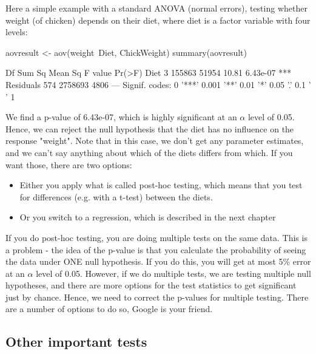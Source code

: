 \documentclass[a4paper,twoside]{tufte-book}\usepackage[]{graphicx}\usepackage[]{color}
\begin{document}
Here a simple example with a standard ANOVA (normal errors), testing whether weight (of chicken) depends on their diet, where diet is a factor variable with four levels:

\begin{Schunk}
\begin{Sinput}
aovresult <- aov(weight~Diet, ChickWeight)
summary(aovresult)
\end{Sinput}
\begin{Soutput}
             Df  Sum Sq Mean Sq F value   Pr(>F)    
Diet          3  155863   51954   10.81 6.43e-07 ***
Residuals   574 2758693    4806                     
---
Signif. codes:  0 '***' 0.001 '**' 0.01 '*' 0.05 '.' 0.1 ' ' 1
\end{Soutput}
\end{Schunk}

We find a p-value of  6.43e-07, which is highly significant at an $\alpha$ level of 0.05. Hence, we can reject the null hypothesis that the diet has no influence on the response "weight". Note that in this case, we don't get any parameter estimates, and we can't say anything about which of the diets differs from which. If you want those, there are two options:

\begin{itemize}
\item Either you apply what is called post-hoc testing, which means that you test for differences (e.g. with a t-test) between the diets.
\item Or you switch to a regression, which is described in the next chapter
\end{itemize}

If you do post-hoc testing, you are doing multiple tests on the same data. This is a problem - the idea of the p-value is that you calculate the probability of seeing the data under ONE null hypothesis. If you do this, you will get at most 5\% error at an $\alpha$ level of 0.05.  However, if we do multiple tests, we are testing multiple null hypotheses, and there are more options for the test statistics to get significant just by chance. Hence, we need to correct the p-values for multiple testing. There are a number of options to do so, Google is your friend. 

\subsection{Other important tests}
\end{document}
